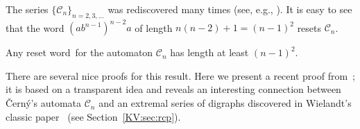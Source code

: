 \documentclass{irmaart}
\newcommand{\sw}{reset word}
\theoremstyle{plain}
\begin{document}
The series $\{\mathcal{C}_n\}_{n=2,3,\dots}$ was rediscovered many times (see,
e.g.,
\cite{Laemmel&Rudner:1969,Fischler&Tannenbaum:1970,Eppstein:1990,Frettloh&Sing2007}).
It is easy to see that the word $(ab^{n-1})^{n-2}a$ of length
$n(n-2)+1=(n-1)^2$ resets $\mathcal{C}_n$.
\begin{proposition}
\label{KV:prop:cerny} Any \sw\ for the automaton $\mathcal{C}_n$ has length at
least $(n-1)^2$.
\end{proposition}
There are several nice proofs for this result. Here we present a recent proof
from~\cite{Ananichev&Gusev&Volkov:2010}; it is based on a transparent idea and
reveals an interesting connection between \v{C}ern\'{y}'s automata
$\mathcal{C}_n$ and an extremal series of digraphs discovered in Wielandt's
classic paper~\cite{Wielandt:1950} (see Section~\ref{KV:sec:rcp}).
\end{document}
